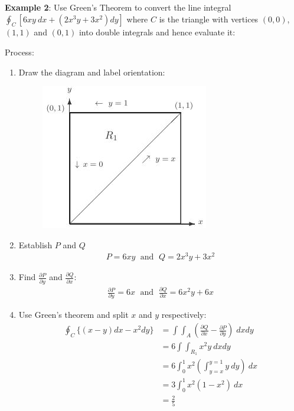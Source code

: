 \documentclass[10pt,a4paper]{article}
\begin{document}
\textbf{Example 2}: Use Green’s Theorem to convert the line integral $\oint_C
[6xy\:dx+(2x^3y+3x^2)dy]$ where $C$ is the triangle with vertices $(0, 0)$, $(1, 1)$ and $(0, 1)$ into double integrals and hence evaluate it:

Process:
\begin{enumerate}
    \item Draw the diagram and label orientation:
    \begin{figure} [h!]
        \centering
        \includegraphics[scale=0.7]{Ex2.2.JPG}
    \end{figure}
    \item Establish $P$ and $Q$ 
    \begin{align*}
        P = 6xy \; \text{ and } \; Q = 2x^3y+3x^2
    \end{align*}
    \item Find $\frac{\partial P}{\partial y}$ and $\frac{\partial Q}{\partial x}$:
    \begin{align*}
        \frac{\partial P}{\partial y} = 6x \; \text{ and } \; \frac{\partial Q}{\partial x} = 6x^2y+6x
    \end{align*}
    \item Use Green's theorem and split $x$ and $y$ respectively:
    \begin{align*}
        \oint_C \{(x-y)dx - x^2dy\} &= \int\int_A \left(\frac{\partial Q}{\partial x}-\frac{\partial P}{\partial y}\right)\; dxdy \\
        &= 6\int \int_{R_1} x^2y \: dxdy \\
        &= 6\int_0^1 x^2 \left(\int_{y=x}^{y=1}y\: dy\right) \: dx \\
        &= 3\int_0^1 x^2(1-x^2)\:dx \\
        &= \frac{2}{5}
    \end{align*}
\end{enumerate}
\end{document}
